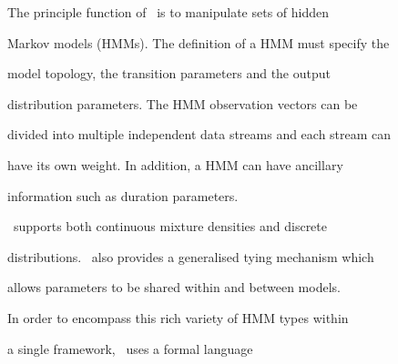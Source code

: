 













%




%












The principle function of \HTK\ is to manipulate sets of hidden


Markov  models (HMMs). The definition of a HMM must specify the


model topology, the transition parameters and the output


distribution parameters. The HMM observation vectors can be


divided into multiple independent data streams and each stream can


have its own weight. In addition, a HMM can have ancillary


information such as duration parameters.


\HTK\ supports both continuous mixture densities and discrete


distributions. \HTK\ also provides a generalised tying mechanism which


allows parameters to be shared within and between models.  







In order to encompass this rich variety of HMM types within


a single framework, \HTK\ uses a formal language 


